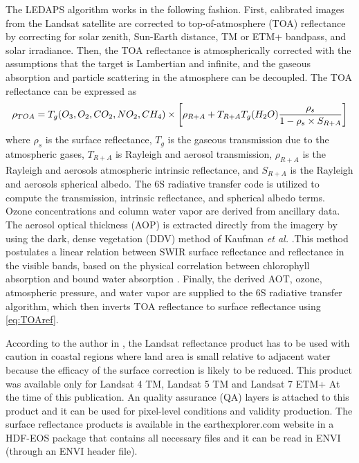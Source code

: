 The LEDAPS algorithm works in the following fashion. First, calibrated images from the Landsat satellite are corrected to { top-of-atmosphere (TOA) reflectance} by correcting for solar zenith, Sun-Earth distance, TM or ETM+ bandpass, and solar irradiance. Then, the TOA reflectance is atmospherically corrected with the assumptions that the target is Lambertian and infinite, and the gaseous absorption and particle scattering in the atmosphere can be decoupled. The TOA reflectance can be expressed as \cite{Masek:2006}
\begin{equation}
	\rho_{TOA}=T_g(O_3,O_2,CO_2,NO_2,CH_4)\\	
		\times \left[\rho_{R+A}+T_{R+A}T_g(H_2O)\frac{\rho_s}{1-\rho_s\times S_{R+A}}\right]
		\label{eq:TOAref} 
\end{equation}
where $\rho_s$ is the surface reflectance, $T_g$ is the gaseous transmission due to the atmospheric gases, $T_{R+A}$ is Rayleigh and aerosol transmission, $\rho_{R+A}$ is the Rayleigh and aerosols atmospheric intrinsic reflectance, and $S_{R+A}$ is the Rayleigh and aerosols spherical albedo. The 6S radiative transfer code is utilized to compute the transmission, intrinsic reflectance, and spherical albedo terms. Ozone concentrations and column water vapor are derived from ancillary data. The aerosol optical thickness (AOP) is extracted directly from the imagery by using the dark, dense vegetation (DDV) method of Kaufman {\it et al.} .This method postulates a linear relation between SWIR surface reflectance and reflectance in the visible bands, based on the physical correlation between chlorophyll absorption and bound water absorption . Finally, the derived AOT, ozone, atmospheric pressure, and water vapor are supplied to the 6S radiative transfer algorithm, which then inverts TOA reflectance to surface reflectance using \autoref{eq:TOAref}. 

According to the author in \cite{LandsatCDR}, the Landsat reflectance product has to be used with caution in coastal regions where land area is small relative to adjacent water because the efficacy of the surface correction is likely to be reduced. This product was available only for Landsat 4 TM, Landsat 5 TM and Landsat 7 ETM+ At the time of this publication. An quality assurance (QA) layers is attached to this product and it can be used for pixel-level conditions and validity production. The surface reflectance products is available in the earthexplorer.com website in a HDF-EOS package that contains all necessary files and it can be read in ENVI (through an ENVI header file).
